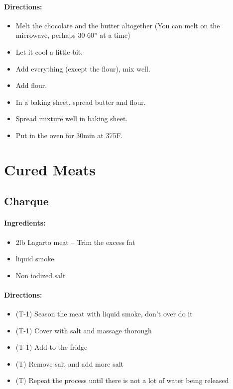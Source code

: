 \documentclass{article}
\begin{document}
\paragraph{Directions:}
\begin{itemize}
    \item Melt the chocolate and the butter altogether (You can melt on the microwave, perhaps 30-60'' at a time)
    \item Let it cool a little bit.
    \item Add everything (except the flour), mix well.
    \item Add flour.
    \item In a baking sheet, spread butter and flour.
    \item Spread mixture well in baking sheet.
    \item Put in the oven for 30min at 375F.
\end{itemize}

\section{Cured Meats}


\subsection{Charque}

\paragraph{Ingredients:}
\begin{itemize}
    \item 2lb Lagarto meat -- Trim the excess fat
    \item liquid smoke
    \item Non iodized salt
\end{itemize}

\paragraph{Directions:}
\begin{itemize}
    \item (T-1) Season the meat with liquid smoke, don't over do it
    \item (T-1) Cover with salt and massage thorough
    \item (T-1) Add to the fridge
    \item (T) Remove salt and add more salt
    \item (T) Repeat the process until there is not a lot of water being released
\end{itemize}
\end{document}
